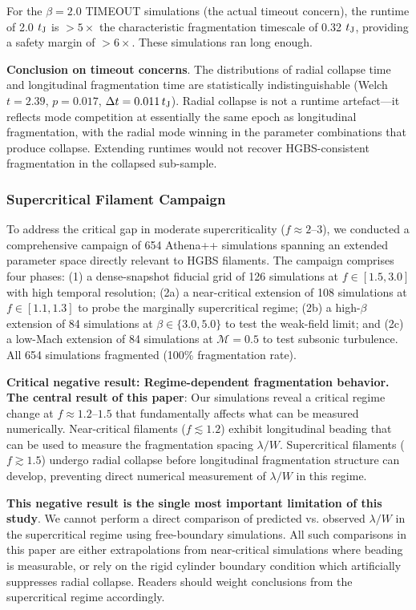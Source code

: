 \documentclass[twocolumn,usenatbib]{mnras}
\begin{document}
For the $\beta=2.0$ TIMEOUT simulations (the actual timeout concern), the runtime of 2.0 $t_{\rm J}$ is $>5\times$ the characteristic fragmentation timescale of 0.32 $t_{\rm J}$, providing a safety margin of $>6\times$. These simulations ran long enough.

\textbf{Conclusion on timeout concerns}. The distributions of radial collapse time and longitudinal fragmentation time are statistically indistinguishable (Welch $t = 2.39$, $p = 0.017$, $\Delta t = 0.011\,t_{\rm J}$). Radial collapse is not a runtime artefact—it reflects mode competition at essentially the same epoch as longitudinal fragmentation, with the radial mode winning in the parameter combinations that produce collapse. Extending runtimes would not recover HGBS-consistent fragmentation in the collapsed sub-sample.

\subsubsection{Supercritical Filament Campaign}
\label{sec:supercrit}

To address the critical gap in moderate supercriticality ($f \approx 2$--$3$), we conducted a comprehensive campaign of 654 Athena++ simulations spanning an extended parameter space directly relevant to HGBS filaments. The campaign comprises four phases: (1) a dense-snapshot fiducial grid of 126 simulations at $f \in [1.5, 3.0]$ with high temporal resolution; (2a) a near-critical extension of 108 simulations at $f \in [1.1, 1.3]$ to probe the marginally supercritical regime; (2b) a high-$\beta$ extension of 84 simulations at $\beta \in \{3.0, 5.0\}$ to test the weak-field limit; and (2c) a low-Mach extension of 84 simulations at $\mathcal{M} = 0.5$ to test subsonic turbulence. All 654 simulations fragmented (100\% fragmentation rate).

\textbf{Critical negative result: Regime-dependent fragmentation behavior.}
\textbf{The central result of this paper}: Our simulations reveal a critical regime change at $f \approx 1.2$--$1.5$ that fundamentally affects what can be measured numerically. Near-critical filaments ($f \lesssim 1.2$) exhibit longitudinal beading that can be used to measure the fragmentation spacing $\lambda/W$. Supercritical filaments ($f \gtrsim 1.5$) undergo radial collapse before longitudinal fragmentation structure can develop, preventing direct numerical measurement of $\lambda/W$ in this regime.

\textbf{This negative result is the single most important limitation of this study}. We cannot perform a direct comparison of predicted vs. observed $\lambda/W$ in the supercritical regime using free-boundary simulations. All such comparisons in this paper are either extrapolations from near-critical simulations where beading is measurable, or rely on the rigid cylinder boundary condition which artificially suppresses radial collapse. Readers should weight conclusions from the supercritical regime accordingly.
\end{document}
